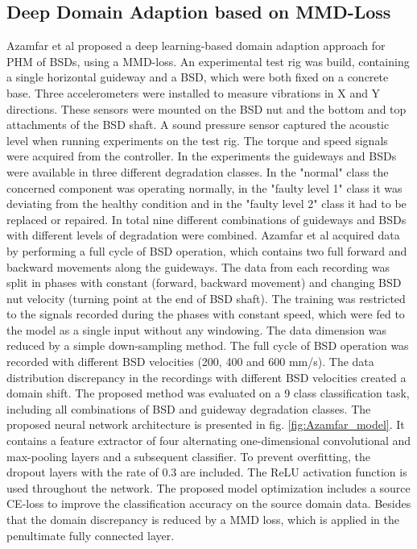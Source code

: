 \subsection{Deep Domain Adaption based on MMD-Loss}
Azamfar et al \cite{AZAMFAR2020103932} proposed a deep learning-based domain adaption approach for PHM of BSDs, using a MMD-loss. An experimental test rig was build, containing a single horizontal guideway and a BSD, which were both fixed on a concrete base. Three accelerometers were installed to measure vibrations in X and Y directions. These sensors were mounted on the BSD nut and the bottom and top attachments of the BSD shaft. A sound pressure sensor captured the acoustic level when running experiments on the test rig. The torque and speed signals were acquired from the controller. In the experiments the guideways and BSDs were available in three different degradation classes. In the "normal" class the concerned component was operating normally, in the "faulty level 1" class it was deviating from the healthy condition and in the "faulty level 2" class it had to be replaced or repaired. In total nine different combinations of guideways and BSDs with different levels of degradation were combined. Azamfar et al acquired data by performing a full cycle of BSD operation, which contains two full forward and backward movements along the guideways. The data from each recording was split in phases with constant (forward, backward movement) and changing BSD nut velocity (turning point at the end of BSD shaft). The training was restricted to the signals recorded during the phases with constant speed, which were fed to the model as a single input without any windowing. The data dimension was reduced by a simple down-sampling method. The full cycle of BSD operation was recorded with different BSD velocities (200, 400 and 600 mm/s). The data distribution discrepancy in the recordings with different BSD velocities created a domain shift. The proposed method was evaluated on a 9 class classification task, including all combinations of BSD and guideway degradation classes. The proposed neural network architecture is presented in fig. \ref{fig:Azamfar_model}. It contains a feature extractor of four alternating one-dimensional convolutional and max-pooling layers and a subsequent classifier. To prevent overfitting, the dropout layers with the rate of 0.3 are included. The ReLU activation function is used throughout the network. The proposed model optimization includes a source CE-loss to improve the classification accuracy on the source domain data. Besides that the domain discrepancy is reduced by a MMD loss, which is applied in the penultimate fully connected layer. 


